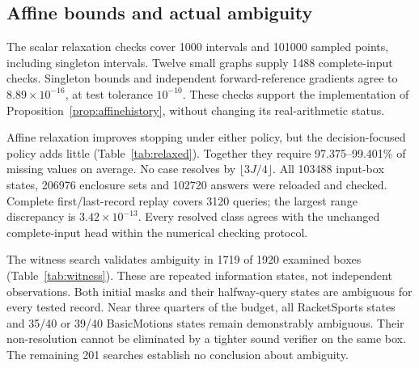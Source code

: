 \documentclass[11pt,a4paper]{article}
\theoremstyle{definition}\newtheorem{definition}[theorem]{Definition}
\begin{document}
\subsection{Affine bounds and actual ambiguity}
The scalar relaxation checks cover 1000 intervals and 101000 sampled points, including singleton intervals. Twelve small graphs supply 1488 complete-input checks. Singleton bounds and independent forward-reference gradients agree to $8.89\times10^{-16}$, at test tolerance $10^{-10}$. These checks support the implementation of Proposition~\ref{prop:affinehistory}, without changing its real-arithmetic status.

\begin{table}[!htbp]\centering\small
\caption{Mean missing scalars retrieved for the unchanged full-record observer. The affine column intersects the new bound with the hybrid enclosure and previous valid bounds. Budgets are 90 for RacketSports and 300 for BasicMotions.}
\label{tab:relaxed}
\end{table}
Affine relaxation improves stopping under either policy, but the decision-focused policy adds little (Table~\ref{tab:relaxed}). Together they require 97.375--99.401\% of missing values on average. No case resolves by $\lfloor3J/4\rfloor$. All 103488 input-box states, 206976 enclosure sets and 102720 answers were reloaded and checked. Complete first/last-record replay covers 3120 queries; the largest range discrepancy is $3.42\times10^{-13}$. Every resolved class agrees with the unchanged complete-input head within the numerical checking protocol.

\begin{table}[!htbp]\centering\small
\caption{Input boxes with two Arb-validated compatible completions having different strict winners, along the decision-focused query path. Denominators are 152 RacketSports or 40 BasicMotions records per row. Columns specify already acquired missing values, with initial budget $J=90$ or $300$.}
\label{tab:witness}
\end{table}
The witness search validates ambiguity in 1719 of 1920 examined boxes (Table~\ref{tab:witness}). These are repeated information states, not independent observations. Both initial masks and their halfway-query states are ambiguous for every tested record. Near three quarters of the budget, all RacketSports states and 35/40 or 39/40 BasicMotions states remain demonstrably ambiguous. Their non-resolution cannot be eliminated by a tighter sound verifier on the same box. The remaining 201 searches establish no conclusion about ambiguity.
\end{document}
